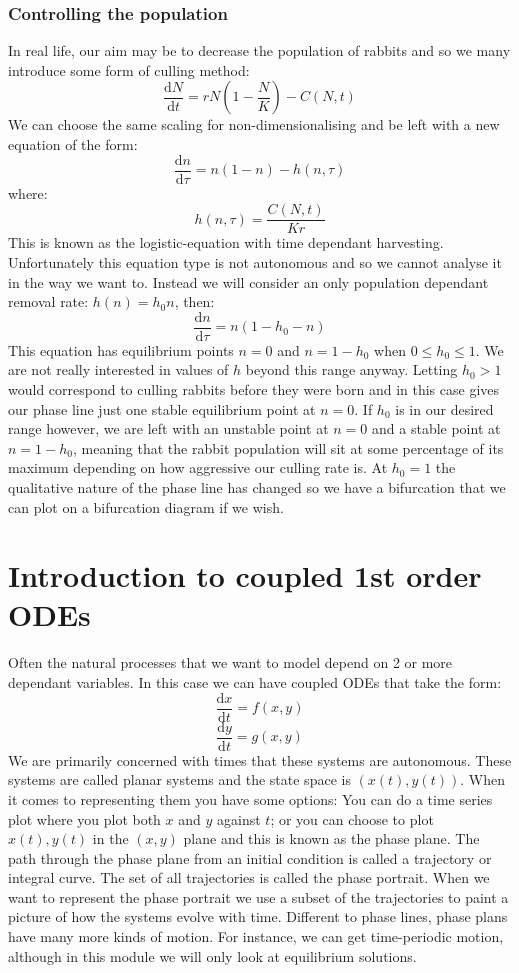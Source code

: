 \documentclass[12pt]{article}
\newcommand{\df}[2]{\frac{\text{d}#1}{\text{d}#2}}
\begin{document}
\subsubsection*{Controlling the population}
In real life, our aim may be to decrease the population of rabbits and so we many introduce some form of culling method:
\[\df{N}{t}=rN\left(1-\frac{N}{K}\right)-C(N,t)\]
We can choose the same scaling for non-dimensionalising and be left with a new equation of the form:
\[\df{n}{\tau}=n(1-n)-h(n,\tau)\]
where:
\[h(n,\tau)=\frac{C(N,t)}{Kr}\]
This is known as the logistic-equation with time dependant harvesting. Unfortunately this equation type is not autonomous and so we cannot analyse it in the way we want to. Instead we will consider an only population dependant removal rate: \(h(n)=h_0n\), then:
\[\df{n}{\tau}=n(1-h_0-n)\]
This equation has equilibrium points \(n=0\) and \(n=1-h_0\) when \(0\leq h_0\leq 1\). We are not really interested in values of \(h\) beyond this range anyway. Letting \(h_0>1\) would correspond to culling rabbits before they were born and in this case gives our phase line just one stable equilibrium point at \(n=0\). If \(h_0\) is in our desired range however, we are left with an unstable point at \(n=0\) and a stable point at \(n=1-h_0\), meaning that the rabbit population will sit at some percentage of its maximum depending on how aggressive our culling rate is. At \(h_0=1\) the qualitative nature of the phase line has changed so we have a bifurcation that we can plot on a bifurcation diagram if we wish.
\section{Introduction to coupled 1st order ODEs}
Often the natural processes that we want to model depend on 2 or more dependant variables. In this case we can have coupled ODEs that take the form:
\[\df{x}{t}=f(x,y)\]
\[\df{y}{t}=g(x,y)\]
We are primarily concerned with times that these systems are autonomous. These systems are called planar systems and the state space is \((x(t),y(t))\). When it comes to representing them you have some options: You can do a time series plot where you plot both \(x\) and \(y\) against \(t\); or you can choose to plot \(x(t),y(t)\) in the \((x,y)\) plane and this is known as the phase plane. The path through the phase plane from an initial condition is called a trajectory or integral curve. The set of all trajectories is called the phase portrait. When we want to represent the phase portrait we use a subset of the trajectories to paint a picture of how the systems evolve with time. Different to phase lines, phase plans have many more kinds of motion. For instance, we can get time-periodic motion, although in this module we will only look at equilibrium solutions.
\end{document}
